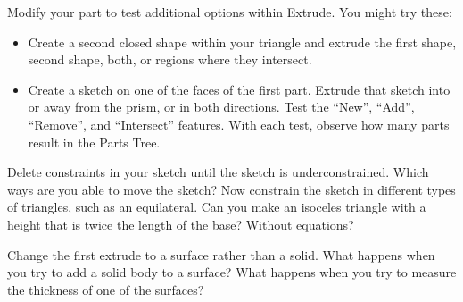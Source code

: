 \begin{exercise}
Modify your part to test additional options within Extrude. You might try these:

\begin{itemize}
\item Create a second closed shape within your triangle and extrude the first shape, second shape, both, or regions where they intersect.

\item Create a sketch on one of the faces of the first part. Extrude that sketch into or away from the prism, or in both directions. Test the ``New'', ``Add'', ``Remove'', and ``Intersect'' features. With each test, observe how many parts result in the Parts Tree.

\end{itemize}
\end{exercise}

\begin{exercise}
Delete constraints in your sketch until the sketch is underconstrained. Which ways are you able to move the sketch? Now constrain the sketch in different types of triangles, such as an equilateral. Can you make an isoceles triangle with a height that is twice the length of the base? Without equations?
\end{exercise}

\begin{exercise}
Change the first extrude to a surface rather than a solid. What happens when you try to add a solid body to a surface? What happens when you try to measure the thickness of one of the surfaces?
\end{exercise}
